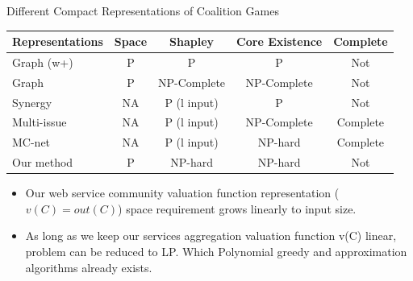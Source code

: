 \documentclass{beamer}
\begin{document}
\begin{frame}{Different Compact Representations of Coalition Games}

    \begin{table}
        \small
        \begin{tabular}{l|c|c|c|c}
        Representations                  & Space    & Shapley                  & Core Existence  & Complete     \\ \hline
        Graph (w+)                       & P        & P                        & P               & Not          \\
        Graph                            & P        & NP-Complete              & NP-Complete     & Not          \\
        Synergy                          & NA       & P (l input)              & P               & Not          \\
        Multi-issue                      & NA       & P (l input)              & NP-Complete     & Complete     \\
        MC-net                           & NA       & P (l input)              & NP-hard         & Complete     \\
        Our method                       & P        & NP-hard                  & NP-hard         & Not          \\
        \end{tabular}
    \end{table}

    \begin{itemize}
        \item Our web service community valuation function representation ($v(C) = out(C)$) space requirement grows linearly to input size.
        \item As long as we keep our services aggregation valuation function v(C) linear, problem can be reduced to LP. Which Polynomial greedy and approximation algorithms already exists.
    \end{itemize}

\end{frame}



\end{document}
